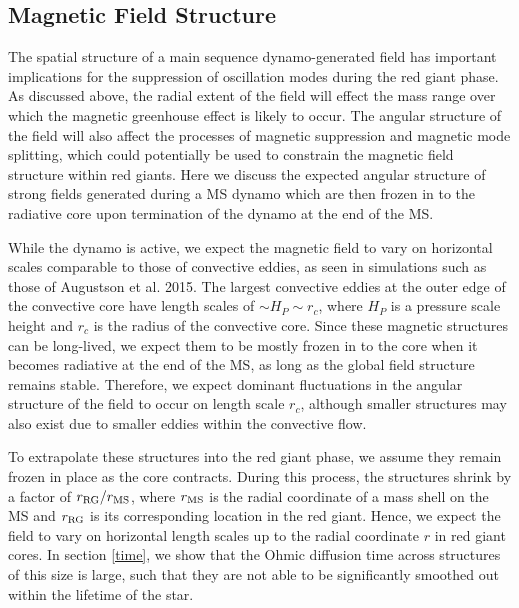 \subsection{Magnetic Field Structure}
\label{fieldstruc}

The spatial structure of a main sequence dynamo-generated field has important implications for the suppression of oscillation modes during the red giant phase. As discussed above, the radial extent of the field will effect the mass range over which the magnetic greenhouse effect is likely to occur. The angular structure of the field will also affect the processes of magnetic suppression and magnetic mode splitting, which could potentially be used to constrain the magnetic field structure within red giants. Here we discuss the expected angular structure of strong fields generated during a MS dynamo which are then frozen in to the radiative core upon termination of the dynamo at the end of the MS.

While the dynamo is active, we expect the magnetic field to vary on horizontal scales comparable to those of convective eddies, as seen in simulations such as those of Augustson et al. 2015. The largest convective eddies at the outer edge of the convective core have length scales of $\sim \! H_P \sim \! r_c$, where $H_P$ is a pressure scale height and $r_c$ is the radius of the convective core. Since these magnetic structures can be long-lived, we expect them to be mostly frozen in to the core when it becomes radiative at the end of the MS, as long as the global field structure remains stable. Therefore, we expect dominant fluctuations in the angular structure of the field to occur on length scale $r_c$, although smaller structures may also exist due to smaller eddies within the convective flow.

To extrapolate these structures into the red giant phase, we assume they remain frozen in place as the core contracts. During this process, the structures shrink by a factor of $r_{\rm RG}/r_{\rm MS}$, where $r_{\rm MS}$ is the radial coordinate of a mass shell on the MS and $r_{\rm RG}$ is its corresponding location in the red giant. Hence, we expect the field to vary on horizontal length scales up to the radial coordinate $r$ in red giant cores. In section \ref{time}, we show that the Ohmic diffusion time across structures of this size is large, such that they are not able to be significantly smoothed out within the lifetime of the star.

